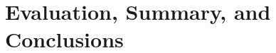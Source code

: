 \documentclass[a4paper,12pt,twoside,openright]{report}
\begin{document}
\chapter{Evaluation, Summary, and Conclusions} 


%

%
%
%
\end{document}

